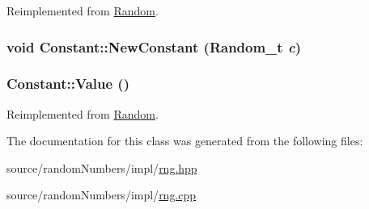 Reimplemented from \hyperlink{classRandom_9ac522e9fe39aefd2cddd88554184b1a}{Random}.\hypertarget{classConstant_e5015bfe8179938344b0730e567929b0}{
\subsubsection[{NewConstant}]{\setlength{\rightskip}{0pt plus 5cm}void Constant::NewConstant ({\bf Random\_\-t} {\em c})}}
\label{classConstant_e5015bfe8179938344b0730e567929b0}


\hypertarget{classConstant_8c4e39053835302870f15f5bbf0dc29e}{
\subsubsection[{Value}]{ Constant::Value ()}}
\label{classConstant_8c4e39053835302870f15f5bbf0dc29e}




Reimplemented from \hyperlink{classRandom_4d1c2876c5c78104186e241209d0e11e}{Random}.

The documentation for this class was generated from the following files:\begin{CompactItemize}
\item 
source/randomNumbers/impl/\hyperlink{rng_8hpp}{rng.hpp}\item 
source/randomNumbers/impl/\hyperlink{rng_8cpp}{rng.cpp}\end{CompactItemize}
